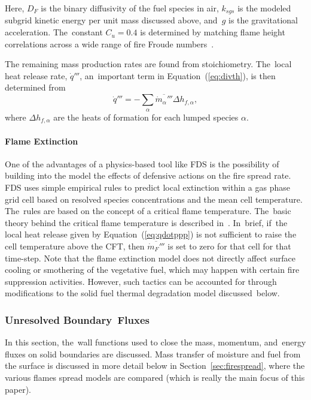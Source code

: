 \documentclass[atmosphere,article,accept,moreauthors,pdftex]{Definitions/mdpi}
\begin{document}
Here, $D_F$ is the binary diffusivity of the fuel species in air, $k_{sgs}$ is the modeled subgrid kinetic energy per unit mass discussed above, and~$g$ is the gravitational acceleration. The~constant $C_u=0.4$ is determined by matching flame height correlations across a wide range of fire Froude numbers~\cite{FDS_Tech_Guide}.

The remaining mass production rates are found from stoichiometry.  The~local heat release rate, $\dot{q}'''$, an~important term in Equation~(\ref{eq:divth}), is then determined from
\begin{equation}
\label{eq:qdotppp}
\dot{q}''' = - \sum_\alpha \overline{\dot{m}_\alpha'''} \Delta h_{f,\alpha},
\end{equation}
where $\Delta h_{f,\alpha}$ are the heats of formation for each lumped species $\alpha$.

\paragraph{Flame Extinction} One of the advantages of a physics-based tool like FDS is the possibility of building into the model the effects of defensive actions on the fire spread rate.  FDS uses simple empirical rules to predict local extinction within a gas phase grid cell based on resolved species concentrations and the mean cell temperature. The~rules are based on the concept of a critical flame temperature. The~basic theory behind the critical flame temperature is described in~\cite{SFPE:Beyler}.  In~brief, if~the local heat release given by Equation~(\ref{eq:qdotppp}) is not sufficient to raise the cell temperature above the CFT, then $\overline{\dot{m}_{F}'''}$ is set to zero for that cell for that time-step.  Note that the flame extinction model does not directly affect surface cooling or smothering of the vegetative fuel, which may happen with certain fire suppression activities. However, such tactics can be accounted for through modifications to the solid fuel thermal degradation model discussed~below.

\subsubsection{Unresolved Boundary~Fluxes}
\label{sec:boundflx}
In this section, the~wall functions used to close the mass, momentum, and~energy fluxes on solid boundaries are discussed.  Mass transfer of moisture and fuel from the surface is discussed in more detail below in Section~\ref{sec:firespread}, where the various flames spread models are compared (which is really the main focus of this paper).
\end{document}
